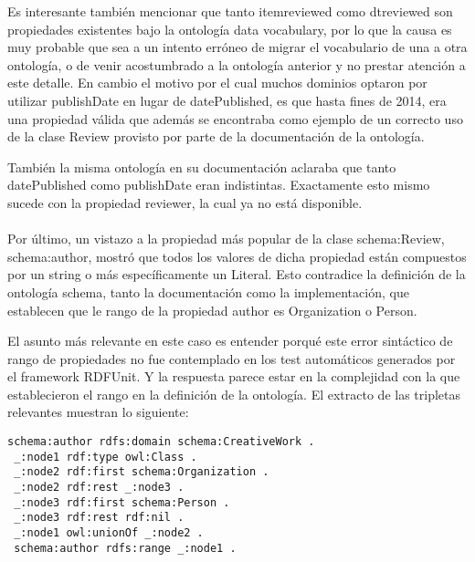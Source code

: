  Es interesante también mencionar que tanto itemreviewed como dtreviewed son propiedades existentes bajo la ontología data vocabulary, 
 por lo que la causa es muy probable que sea a un intento erróneo de migrar el vocabulario de una a otra ontología, o de venir acostumbrado a la 
 ontología anterior y no prestar atención a este detalle.
 En cambio el motivo por el cual muchos dominios optaron por utilizar publishDate en lugar de datePublished, es que hasta fines de 2014, 
 era una propiedad válida que además se encontraba como ejemplo de un correcto uso de la clase Review provisto por parte de la documentación 
 de la ontología. 
 
 También la misma ontología en su documentación aclaraba que tanto datePublished como publishDate eran indistintas.
 Exactamente esto mismo sucede con la propiedad reviewer, la cual ya no está disponible.
 \\\\
 Por último, un vistazo a la propiedad más popular de la clase schema:Review, schema:author, mostró que todos los valores de dicha propiedad están compuestos 
 por un string o más específicamente un Literal. Esto contradice la definición de la ontología schema, tanto la documentación como la implementación, que
 establecen que le rango de la propiedad author es Organization o Person. 
 
 El asunto más relevante en este caso es entender porqué este error sintáctico de rango de propiedades no fue contemplado en los test 
 automáticos generados por el framework RDFUnit.
 Y la respuesta parece estar en la complejidad con la que establecieron el rango en la definición de la ontología. El extracto de las 
 tripletas relevantes muestran lo siguiente:
 \begin{lstlisting}[frame=single]
 schema:author rdfs:domain schema:CreativeWork .
 _:node1 rdf:type owl:Class .
 _:node2 rdf:first schema:Organization .
 _:node2 rdf:rest _:node3 .
 _:node3 rdf:first schema:Person .
 _:node3 rdf:rest rdf:nil .
 _:node1 owl:unionOf _:node2 .
 schema:author rdfs:range _:node1 .
 \end{lstlisting}
 
